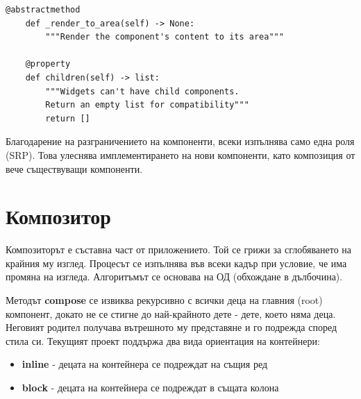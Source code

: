 \begin{itemize}
\begin{lstlisting}[style=py]
    @abstractmethod
    def _render_to_area(self) -> None:
        """Render the component's content to its area"""

    @property
    def children(self) -> list:
        """Widgets can't have child components. 
        Return an empty list for compatibility"""
        return []
                        \end{lstlisting}
        \end{itemize}

        Благодарение на разграничението на компоненти, всеки изпълнява само 
        една роля (SRP). Това улеснява имплементирането на нови компоненти, 
        като композиция от вече съществуващи компоненти.

\section{Композитор}

        Композиторът е съставна част от приложението. Той се грижи за 
        сглобяването на крайния му изглед. Процесът се изпълнява 
        във всеки кадър при условие, че има промяна на изгледа. Алгоритъмът се
        основава на ОД (обхождане в дълбочина).

        Методът \textbf{compose} се извиква рекурсивно с всички деца на главния
        (root) компонент, докато не се стигне до най-крайното дете - дете, 
        което няма деца. Неговият родител получава вътрешното му представяне и
        го подрежда според стила си. Текущият проект поддържа два вида 
        ориентация на контейнери:
        \begin{itemize}
                \item \textbf{inline} - децата на контейнера се подреждат на
                        същия ред
                \item \textbf{block} - децата на контейнера се подреждат в 
                        същата колона
        \end{itemize}

